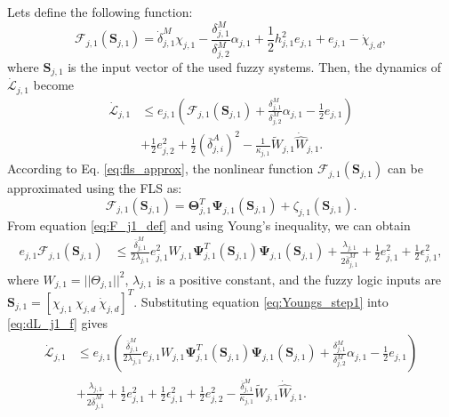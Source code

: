 Lets define the following function:
\begin{equation}\label{eq:F_j1_def}
\mathcal{F}_{j,1}(\mathbf{S}_{j,1}) = \dot{\delta}_{j,1}^M \chi_{j,1} - \frac{\delta_{j,1}^M}{\delta_{j,2}^M}\alpha_{j,1} + \frac{1}{2}h_{j,1}^2 e_{j,1} + e_{j,1} - \dot{\chi}_{j,d},
\end{equation}
where $\mathbf{S}_{j,1}$ is the input vector of the used fuzzy systems. Then, the dynamics of $\dot{\mathcal{L}}_{j,1}$ become
\begin{equation} \label{eq:dL_j1_f}
\begin{aligned}
\dot{\mathcal{L}}_{j,1} &\leq  e_{j,1}\left (\mathcal{F}_{j,1}(\mathbf{S}_{j,1}) + \frac{\delta_{j,1}^M}{\delta_{j,2}^M}\alpha_{j,1} - \frac{1}{2}e_{j,1}\right ) \\
&+ \frac{1}{2}e_{j,2}^2 + \frac{1}{2} (\overline{\delta}_{j,i}^A)^2 - \frac{1}{\kappa_{j,1}}\tilde{W}_{j,1}\dot{\hat{W}}_{j,1}.
\end{aligned}
\end{equation}
According to Eq. \eqref{eq:fls_approx}, the nonlinear function $\mathcal{F}_{j,1}(\mathbf{S}_{j,1})$ can be approximated using the FLS as:
\begin{equation}
\mathcal{F}_{j,1}(\mathbf{S}_{j,1}) = \mathbf{\Theta}_{j,1}^T\mathbf{\Psi}_{j,1}(\mathbf{S}_{j,1}) + \zeta_{j,1}(\mathbf{S}_{j,1}).
\end{equation}
From equation \eqref{eq:F_j1_def} and using Young's inequality, we can obtain
\begin{equation}\label{eq:Youngs_step1}
\begin{aligned}
e_{j,1}\mathcal{F}_{j,1}(\mathbf{S}_{j,1}) &\leq \frac{\overline{\delta}_{j,1}^M}{2\lambda_{j,1}}e_{j,1}^2W_{j,1}\mathbf{\Psi}_{j,1}^T(\mathbf{S}_{j,1})\mathbf{\Psi}_{j,1}(\mathbf{S}_{j,1}) + \frac{\lambda_{j,1}}{2\overline{\delta}_{j,1}^M} + \frac{1}{2}e_{j,1}^2 + \frac{1}{2}\epsilon_{j,1}^2,
\end{aligned}
\end{equation}
where $W_{j,1} = ||\Theta_{j,1}||^2$, $\lambda_{j,1}$ is a positive constant, and the fuzzy logic inputs are $\mathbf{S}_{j,1}=[\chi_{j,1} \ \chi_{j,d} \ \dot{\chi}_{j,d}]^T$. Substituting equation \eqref{eq:Youngs_step1} into \eqref{eq:dL_j1_f} gives
\begin{equation}\label{eq:dL_j1_subbed}
\begin{aligned}
\dot{\mathcal{L}}_{j,1} &\leq e_{j,1}\left( \frac{\overline{\delta}_{j,1}^M}{2\lambda_{j,1}}e_{j,1}W_{j,1}\mathbf{\Psi}_{j,1}^T(\mathbf{S}_{j,1})\mathbf{\Psi}_{j,1}(\mathbf{S}_{j,1}) + \frac{\delta_{j,1}^M}{\delta_{j,2}^M}\alpha_{j,1} - \frac{1}{2}e_{j,1}\right ) \\
&+ \frac{\lambda_{j,1}}{2\overline{\delta}_{j,1}^M} + \frac{1}{2}e_{j,1}^2 + \frac{1}{2}\epsilon_{j,1}^2 + \frac{1}{2}e_{j,2}^2 - \frac{\overline{\delta}_{j,1}^M}{\kappa_{j,1}}\tilde{W}_{j,1}\dot{\hat{W}}_{j,1}.
\end{aligned}
\end{equation}
